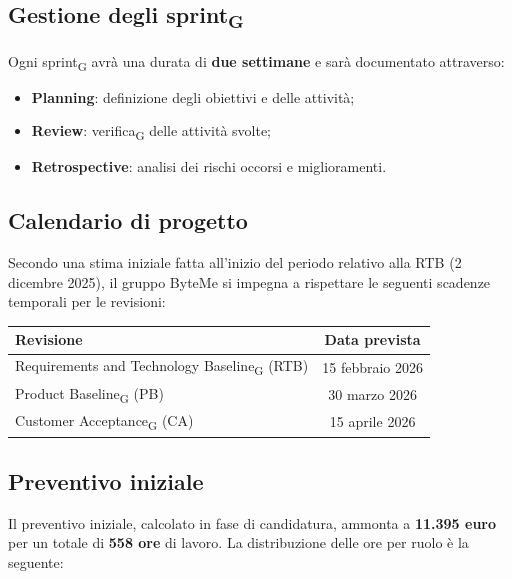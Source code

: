 \documentclass[11pt,a4paper]{article}
\newcommand{\gls}[1]{#1\textsubscript{G}}
\begin{document}
\subsection{Gestione degli \gls{sprint}}
Ogni \gls{sprint} avrà una durata di \textbf{due settimane} e sarà documentato attraverso:
\begin{itemize}
    \item \textbf{Planning}: definizione degli obiettivi e delle attività;
    \item \textbf{Review}: \gls{verifica} delle attività svolte;
    \item \textbf{Retrospective}: analisi dei rischi occorsi e miglioramenti.
\end{itemize}

\subsection{Calendario di progetto}
Secondo una stima iniziale fatta all'inizio del periodo relativo alla RTB (2 dicembre 2025), il gruppo ByteMe si impegna a rispettare le seguenti scadenze temporali per le revisioni:
\begin{center}
    \begin{tabular}{|l|c|}
        \hline
        \textbf{Revisione} & \textbf{Data prevista} \\
        \hline
        Requirements and Technology Baseline\textsubscript{G} (RTB) & 15 febbraio 2026 \\
        \hline
        Product Baseline\textsubscript{G} (PB) & 30 marzo 2026 \\
        \hline
        Customer Acceptance\textsubscript{G} (CA) & 15 aprile 2026 \\
        \hline
    \end{tabular}
\end{center}

\subsection{Preventivo iniziale}
Il preventivo iniziale, calcolato in fase di candidatura, ammonta a \textbf{11.395 euro} per un totale di \textbf{558 ore} di lavoro. La distribuzione delle ore per ruolo è la seguente:
\end{document}
